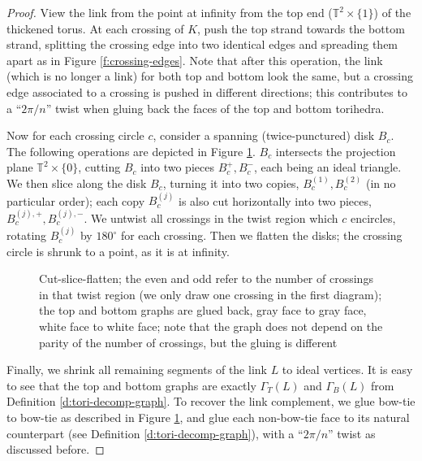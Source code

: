 \documentclass[11pt]{amsart}
\newcommand{\defref}[1]{Definition \ref{#1}}
\newcommand{\figref}[1]{Figure \ref{#1}}
\newcommand{\torus}{{\mathbb{T}^2}}
\theoremstyle{plain}
\theoremstyle{definition}
\begin{document}
\begin{proof}
View the link from the point at infinity from the top end
($\torus \times \{1\}$) of the thickened torus.
At each crossing of $K$,
push the top strand towards the bottom strand,
splitting the crossing edge into two
identical edges and spreading them apart as in
\figref{f:crossing-edges}.
Note that after this operation, the link (which is no longer a link)
for both top and bottom look the same,
but a crossing edge associated to a crossing
is pushed in different directions;
this contributes to a ``$2\pi/n$'' twist
when gluing back the faces of the top and bottom torihedra.


Now for each crossing circle $c$, consider a spanning
(twice-punctured) disk $B_c$.
The following operations are depicted in \figref{f:cut-slice-flatten}.
$B_c$ intersects the projection plane $\torus \times \{0\}$,
cutting $B_c$ into two pieces $B_c^+,B_c^-$,
each being an ideal triangle.
We then slice along the disk $B_c$, turning it into two copies,
$B_c^{(1)},B_c^{(2)}$ (in no particular order);
each copy $B_c^{(j)}$ is also cut horizontally into two pieces,
$B_c^{(j),+},B_c^{(j),-}$.
We untwist all crossings in the twist region
which $c$ encircles,
rotating $B_c^{(j)}$ by $180^\circ$ for each crossing.
Then we flatten the disks;
the crossing circle is shrunk to a point,
as it is at infinity.


\begin{figure}[ht]

\caption{Cut-slice-flatten;
the even and odd refer to the number of crossings
in that twist region
(we only draw one crossing in the first diagram);
the top and bottom graphs are glued back,
gray face to gray face, white face to white face;
note that the graph does not depend on the
parity of the number of crossings, but the gluing is different}
\label{f:cut-slice-flatten}
\end{figure}


Finally, we shrink all remaining segments of the link $L$
to ideal vertices.
It is easy to see that the top and bottom graphs
are exactly $\Gamma_T(L)$ and $\Gamma_B(L)$ from
\defref{d:tori-decomp-graph}.
To recover the link complement,
we glue bow-tie to bow-tie as described in \figref{f:cut-slice-flatten},
and glue each non-bow-tie face to its natural counterpart
(see \defref{d:tori-decomp-graph}),
with a ``$2\pi/n$'' twist as discussed before.



\end{proof}
\end{document}
